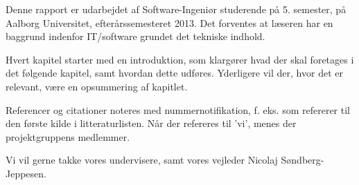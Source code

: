 Denne rapport er udarbejdet af Software-Ingeniør studerende på 5. semester, på Aalborg Universitet, efterårssemesteret 2013.
Det forventes at læseren har en baggrund indenfor IT/software grundet det tekniske indhold.

Hvert kapitel starter med en introduktion, som klargører hvad der skal foretages i det følgende kapitel, samt hvordan dette udføres.
Yderligere vil der, hvor det er relevant, være en opsummering af kapitlet.

Referencer og citationer noteres med nummernotifikation, f. eks. \cite{probabilisticRobotics} som refererer til den første kilde i litteraturlisten.
Når der refereres til 'vi', menes der projektgruppens medlemmer.

Vi vil gerne takke vores undervisere, samt vores vejleder Nicolaj Søndberg-Jeppesen.